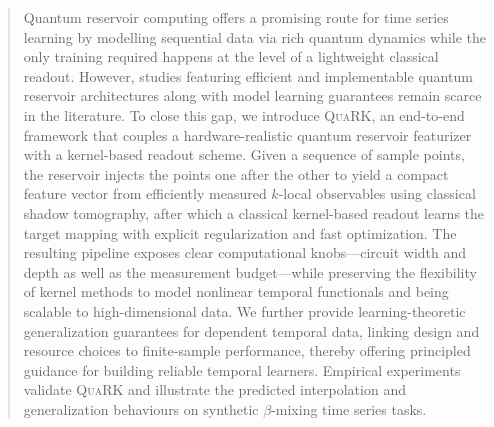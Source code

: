 \documentclass[sigconf, nonacm]{acmart}
\begin{document}
\begin{abstract}
  Quantum reservoir computing offers a promising route for time series learning by modelling sequential data via rich quantum dynamics while the only training required happens at the level of a lightweight classical readout. However, studies featuring efficient and implementable quantum reservoir architectures along with model learning guarantees remain scarce in the literature. To close this gap, we introduce \textsc{QuaRK}, an end-to-end framework that couples a hardware-realistic quantum reservoir featurizer with a kernel-based readout scheme. Given a sequence of sample points, the reservoir injects the points one after the other to yield a compact feature vector from efficiently measured $k$-local observables using classical shadow tomography, after which a classical kernel-based readout learns the target mapping with explicit regularization and fast optimization. The resulting pipeline exposes clear computational knobs—circuit width and depth as well as the measurement budget—while preserving the flexibility of kernel methods to model nonlinear temporal functionals and being scalable to high-dimensional data. We further provide learning-theoretic generalization guarantees for dependent temporal data, linking design and resource choices to finite-sample performance, thereby offering principled guidance for building reliable temporal learners. Empirical experiments validate \textsc{QuaRK} and illustrate the predicted interpolation and generalization behaviours on synthetic $\beta$-mixing time series tasks.
\end{abstract}





\maketitle












\appendix


\end{document}
